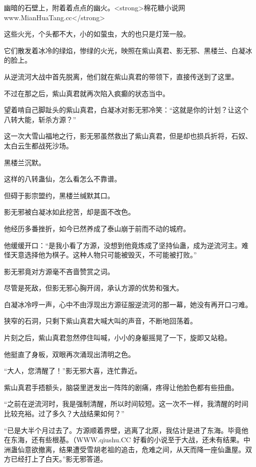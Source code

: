
\begin{this_body}

幽暗的石壁上，附着着点点的幽火。<strong>棉花糖小说网www.MianHuaTang.cc</strong>

这些火光，个头都不大，小的如萤虫，大的也只是灯笼一般。

它们散发着冰冷的绿焰，惨绿的火光，映照在紫山真君、影无邪、黑楼兰、白凝冰的脸上。

从逆流河大战中首先脱离，他们就在紫山真君的带领下，直接传送到了这里。

不过在那之后，紫山真君就再次陷入疯癫的状态当中。

望着啃自己脚趾头的紫山真君，白凝冰对影无邪冷笑：“这就是你的计划？让这个八转大能，斩杀方源？”

这一次大雪山福地之行，影无邪虽然救出了紫山真君，但是却也损兵折将，石奴、太白云生都战死沙场。

黑楼兰沉默。

这样的八转蛊仙，怎么看怎么不靠谱。

但碍于影宗盟约，黑楼兰缄默其口。

影无邪被白凝冰如此挖苦，却是面不改色。

他经历多番挫折，如今已然养成了泰山崩于前而不动的城府。

他缓缓开口：“是我小看了方源，没想到他竟炼成了坚持仙蛊，成为逆流河主。难怪天意选择他为棋子。这种人物只可能被毁灭，不可能被打败。”

影无邪竟对方源毫不吝啬赞赏之词。

尽管是死敌，但影无邪心胸开阔，承认方源的优势和强大。

白凝冰冷哼一声，心中不由浮现出方源征服逆流河的那一幕，她没有再开口刁难。

狭窄的石洞，只剩下紫山真君大喊大叫的声音，不断地回荡着。

片刻之后，紫山真君忽然停住叫喊，小小的身躯摇晃了一下，旋即又站稳。

他挺直了身板，双眼再次涌现出清明之色。

“大人，您清醒了！”影无邪大喜，连忙靠近。

紫山真君手捂额头，脑袋里迸发出一阵阵的剧痛，疼得让他脸色都有些扭曲。

“之前在逆流河时，我是强制清醒，所以时间较短。这一次不一样，我清醒的时间比较充裕。过了多久？大战结果如何？”

“已是大半个月过去了。方源顺着界壁，逃离了北原，我估计是进了东海。毕竟他在东海，还有些根基。（WWW.qiushu.CC 好看的小说至于大战，还未有结果。中洲蛊仙意欲撤离，结果遭受雪胡老祖的追击，危难之间，从天而降一座仙蛊屋。双方已经打上了白天。”影无邪答道。


\end{this_body}
